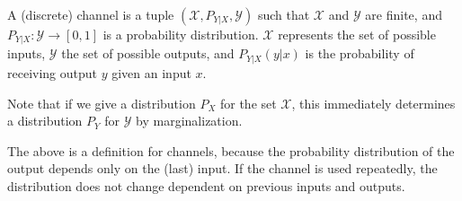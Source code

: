 \begin{definition}
A (discrete) channel is a tuple $(\mathcal{X}, P_{Y|X}, \mathcal{Y})$ such that $\mathcal{X}$ and $\mathcal{Y}$ are finite, and $P_{Y|X} : \mathcal{Y} \to [0,1]$ is a probability distribution. $\mathcal{X}$ represents the set of possible inputs, $\mathcal{Y}$ the set of possible outputs, and $P_{Y|X}(y|x)$ is the probability of receiving output $y$ given an input $x$.
\end{definition}
Note that if we give a distribution $P_X$ for the set $\mathcal{X}$, this immediately determines a distribution $P_Y$ for $\mathcal{Y}$ by marginalization.

The above is a definition for  channels, because the probability distribution of the output depends only on the (last) input. If the channel is used repeatedly, the distribution does not change dependent on previous inputs and outputs.

